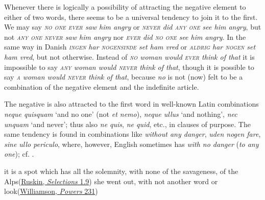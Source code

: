 \label{join-to-first}Whenever there is logically a possibility of attracting the negative element to either of two words, there seems to be a universal tendency to join it to the first. We may say \textit{\textsc{no one ever} saw him angry} or \textit{\textsc{never} did \textsc{any one} see him angry}, but not \textit{\textsc{any one never} saw him angry} nor \textit{\textsc{ever} did \textsc{no one} see him angry}. In the same way in Danish \textit{\textsc{ingen} har \textsc{nogensinde} set ham vred} or \textit{\textsc{aldrig} har \textsc{nogen} set ham vred}, but not otherwise. Instead of \textit{\textsc{no} woman would \textsc{ever} think of that} it is impossible to say \textit{\textsc{any} woman would \textsc{never} think of that}, though it is possible to say \textit{\textsc{a} woman would \textsc{never} think of that}, because \textit{no} is not (now) felt to be a combination of the negative element and the indefinite article. %

The negative is also attracted to the first word in well-known Latin combinations \textit{neque quisquam} `and no one' (not \textit{et nemo}), \textit{neque ullus} `and nothing', \textit{nec unquam} `and never'; thus also \textit{ne quis}, \textit{ne quid}, etc., in clauses of purpose. The same tendency is found in combinations like \textit{without any danger}, \textit{uden nogen fare}, \textit{sine ullo periculo}, where, however, English sometimes has \textit{with no danger} (\textit{to any one}); cf. .\largerpage[2]

\ea \label{ex:06-31}
\ea it is a spot which has all the solemnity, with none of the savageness, of the Alps\hfill(\href{https://archive.org/details/selectionsfromwr0000rusk/page/4/mode/2up?q=%22spot+which+has+all+the+solemnity%22&view=theater}{Ruskin, \textit{Selections} 1.9})
\ex she went out, with not another word or look\hfill(\href{https://archive.org/details/powersmaxine00williala/page/250/mode/2up?q=%22she+went+out%2C+with+not+another+word+or+look%22&view=theater}{Williamson, \textit{Powers} 231})
\z
\z

